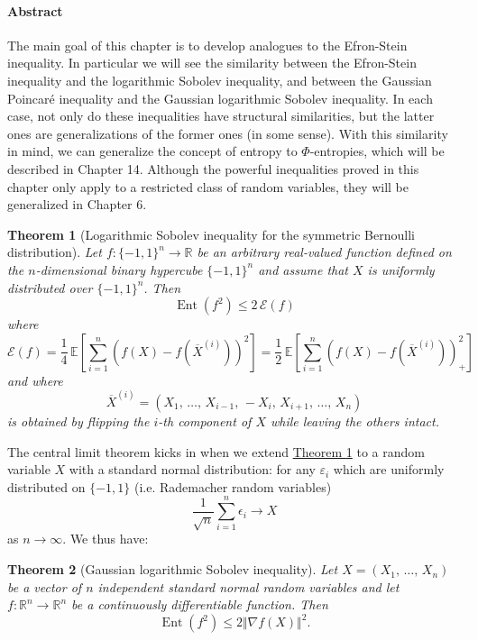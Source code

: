 \documentclass[reqno]{amsproc}
\newtheorem{theorem}{Theorem}
\newcommand{\fref}[2]{\hyperref[#2]{#1 \ref*{#2}}}
\newcommand{\R}{\mathbb{R}}
\newcommand{\Rn}{\mathbb{R}^n}
\newcommand{\E}{\mathbb{E}} %
\DeclareMathOperator{\Ent}{Ent} %
\begin{document}
\paragraph{\textbf{Abstract}}
	The main goal of this chapter is to develop analogues to the Efron-Stein inequality.
	In particular we will see the similarity between the Efron-Stein inequality and the logarithmic Sobolev inequality,
	and between the Gaussian Poincar\'{e} inequality and the Gaussian logarithmic Sobolev inequality.
	In each case, not only do these inequalities have structural similarities, but the latter ones are generalizations of the former ones (in some sense).
	With this similarity in mind, we can generalize the concept of entropy to $\Phi$-entropies, which will be described in Chapter 14.
	Although the powerful inequalities proved in this chapter only apply to a restricted class of random variables, they will be generalized in Chapter 6.

\begin{theorem}[Logarithmic Sobolev inequality for the symmetric Bernoulli distribution]
\label{thm:log_Sob_ineq_sym_Bernoulli}
	Let $f:{\{-1,1\}}^n \rightarrow \R$ be an arbitrary real-valued function defined on the $n$-dimensional binary hypercube ${\{-1,1\}}^n$
	and assume that $X$ is uniformly distributed over ${\{-1,1\}}^n$. Then 
	$$ \Ent(f^2) \leq 2\,\mathcal{E}(f)$$
	where $$\mathcal{E}(f) = \frac{1}{4}\,\E\left[\sum_{i=1}^n \left(f(X)-f(\overline{X}^{(i)})\right)^2\right]
	= \frac{1}{2}\,\E\left[\sum_{i=1}^n \left(f(X)-f(\overline{X}^{(i)})\right)^2_+\right]$$
	and where $$\overline{X}^{(i)} = (X_1,\,\dots,\,X_{i-1},\,-X_i,\,X_{i+1},\,\dots,\,X_n)$$ is obtained by flipping the $i$-th component of $X$ while leaving the others intact.
\end{theorem}

	The central limit theorem kicks in when we extend \fref{Theorem}{thm:log_Sob_ineq_sym_Bernoulli} to a random variable $X$ with a standard normal distribution: 
	for any $\varepsilon_i$ which are uniformly distributed on $\{-1,1\}$ (i.e. Rademacher random variables)
	$$\frac{1}{\sqrt{n}}\sum_{i=1}^n \epsilon_i\rightarrow X$$
	as $n\to\infty$. We thus have:

\begin{theorem}[Gaussian logarithmic Sobolev inequality]
\label{thm:Gaussian_log_Sob_ineq}
	Let $X=(X_1,\,\dots,\,X_n)$ be a vector of $n$ independent standard normal random variables and let $f:\Rn \to \Rn$ be a continuously differentiable function. Then
	$$ \Ent(f^2) \leq 2\Vert \nabla f(X) \Vert^2.$$
\end{theorem}
\end{document}
